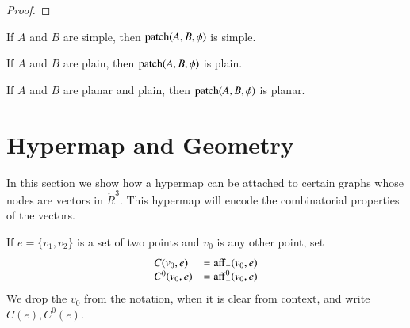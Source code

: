 \begin{proof}
\end{proof}

\begin{lemma} If $A$ and $B$ are simple, then
${\operatorname{patch}}(A,B,\phi)$ is simple.
\end{lemma}

\begin{lemma} If $A$ and $B$ are plain, then
${\operatorname{patch}}(A,B,\phi)$ is plain.
\end{lemma}

\begin{lemma} If $A$ and $B$ are planar and plain, then
    ${\operatorname{patch}}(A,B,\phi)$ is planar.
\end{lemma}




\chapter{Hypermap and Geometry}

In this section we show how a hypermap can be attached to certain
graphs whose nodes are vectors in $\ring{R}^3$. This hypermap will
encode the combinatorial properties of the vectors.



If $e=\{v_1,v_2\}$ is a set of two points and $v_0$ is any other point,
set
  $$
  \begin{array}{lll}
  C(v_0,e) &= {\operatorname{aff}}_+(v_0,e)\\
  C^0(v_0,e) &= {\operatorname{aff}}^0_+(v_0,e)\\
  \end{array}
  $$
We drop the $v_0$ from the notation, when it is clear from context,
and write $C(e), C^0(e)$.

